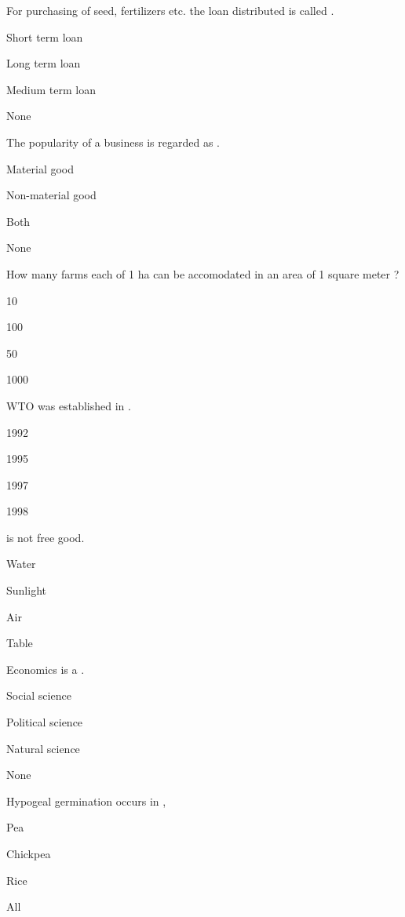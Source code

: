 \begin{questions}
\question For purchasing of seed, fertilizers etc. the loan distributed is called \fillin[][3cm].
\begin{items}
\item Short term loan
\item Long term loan
\item Medium term loan
\item None
\end{items}

\question The popularity of a business is regarded as \fillin[][3cm].
\begin{items}
\item Material good
\item* Non-material good
\item Both
\item None
\end{items}

\question How many farms each of 1 ha can be accomodated in an area of 1 square meter ?
\begin{items}
\item 10
\item 100
\item 50
\item 1000
\end{items}

\question WTO was established in \fillin[][3cm].
\begin{items}
\item 1992
\item 1995
\item 1997
\item 1998
\end{items}

\question \fillin[][3cm] is not free good.
\begin{items}
\item Water
\item Sunlight
\item Air
\item Table
\end{items}

\question Economics is a \fillin[][3cm].
\begin{items}
\item Social science
\item Political science
\item Natural science
\item None
\end{items}

\question Hypogeal germination occurs in \fillin[][3cm],
\begin{items}
\item Pea
\item Chickpea
\item Rice
\item All
\end{items}


\end{questions}
